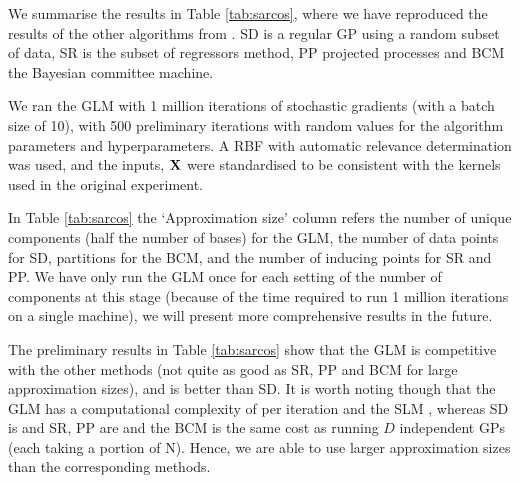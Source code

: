 \documentclass[11pt, oneside]{article}
\begin{document}
We summarise the results in Table \ref{tab:sarcos}, where we have reproduced
the results of the other algorithms from \citet{Rasmussen2006}. SD is a regular
GP using a random subset of data, SR is the subset of regressors method, PP
projected processes and BCM the Bayesian committee machine.

We ran the GLM with 1 million iterations of stochastic gradients (with a batch
size of 10), with 500 preliminary iterations with random values for the
algorithm parameters and hyperparameters. A RBF with automatic relevance
determination was used, and the inputs, $\mathbf{X}$ were standardised to be
consistent with the kernels used in the original experiment.

In Table \ref{tab:sarcos} the `Approximation size' column refers the number of
unique components (half the number of bases) for the GLM, the number of data
points for SD, partitions for the BCM, and the number of inducing points for SR
and PP. We have only run the GLM once for each setting of the number of
components at this stage (because of the time required to run 1 million 
iterations on a single machine), we will present more comprehensive results in
the future.

The preliminary results in Table \ref{tab:sarcos} show that the GLM is
competitive with the other methods (not quite as good as SR, PP and BCM for
large approximation sizes), and is better than SD. It is worth noting though
that the GLM has a computational complexity of  per iteration and the
SLM , whereas SD is  and SR, PP are  and the
BCM is the same cost as running $D$ independent GPs (each taking a portion of
N). Hence, we are able to use larger approximation sizes than the corresponding
methods.


\end{document}
